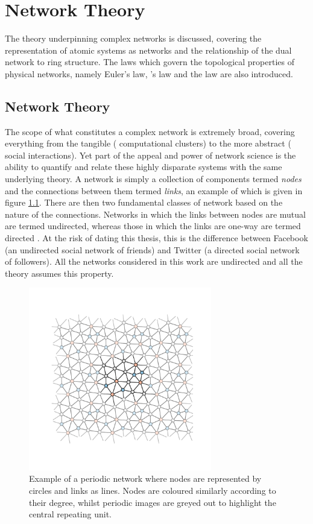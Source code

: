 \chapter{Network Theory}
\label{ch:networktheory}

\begin{chapterabstract}
The theory underpinning complex networks is discussed, covering the representation of atomic systems as networks and the relationship of the dual network to ring structure.
The laws which govern the topological properties of physical networks, namely Euler's law, \lm's law and the \aw{} law are also introduced.
\end{chapterabstract}

\section{Network Theory}
\label{sec:networktheory}

The scope of what constitutes a complex network is extremely broad, covering everything from the tangible (\eg{} computational clusters) to the more abstract (\eg{} social interactions). Yet part of the appeal and power of network science is the ability to quantify and relate these highly disparate systems with the same underlying theory.
A network is simply a collection of components termed \textit{nodes} and the connections between them termed \textit{links}, an example of which is given in figure \ref{fig:smallnet}.
There are then two fundamental classes of network based on the nature of the connections.
Networks in which the links between nodes are mutual are termed undirected, whereas those in which the links are one\--way are termed directed \cite{barabasi2016n}.
At the risk of dating this thesis, this is the difference between Facebook (an undirected social network of friends) and Twitter (a directed social network of followers).
All the networks considered in this work are undirected and all the theory assumes this property.

\begin{figure}[ht]
     \centering
      \includegraphics[width=8cm]{./figures/methods/small_periodic_net.pdf}
     \caption{Example of a periodic \td{} network where nodes are represented by circles and links as lines. Nodes are coloured similarly according to their degree, whilst periodic images are greyed out to highlight the central repeating unit.}
     \label{fig:smallnet}
\end{figure}

